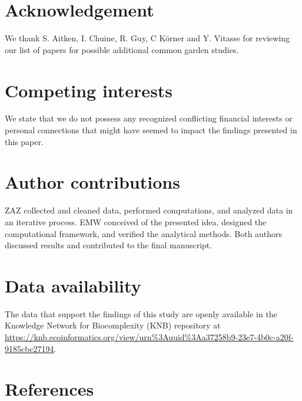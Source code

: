 \documentclass{article}
\begin{document}
 
\section{Acknowledgement}
We thank S. Aitken,  I. Chuine, R. Guy, C K\"{o}rner and Y. Vitasse for reviewing our list of papers for possible additional common garden studies. 

\section{Competing interests}
We state that we do not possess any recognized conflicting financial interests or personal connections that might have seemed to impact the findings presented in this paper.

\section{Author contributions}
ZAZ collected and cleaned data, performed computations, and analyzed data in an iterative process. EMW conceived of the presented idea, designed the computational framework, and verified the analytical methods. Both authors discussed results and contributed to the final manuscript. 



\section{Data availability}
The data that support the findings of this study are openly available in the Knowledge Network for Biocomplexity (KNB) repository at \url{https://knb.ecoinformatics.org/view/urn\%3Auuid\%3Aa37258b9-23e7-4b0c-a20f-9185cbc27194}.
 
\section{References} %




\clearpage
\end{document}
